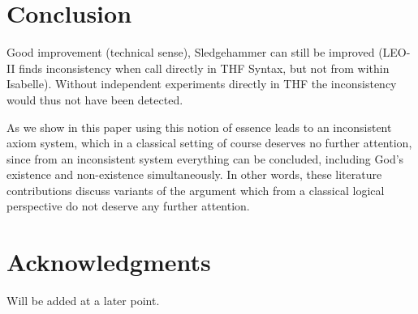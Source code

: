 \documentclass{article}
\begin{document}
\section{Conclusion}


Good improvement (technical sense), Sledgehammer can still be improved
(LEO-II finds inconsistency when call directly in THF Syntax, but not
from within Isabelle). Without independent experiments directly in THF 
the inconsistency would thus not have been detected.


As we show in this paper using this notion of essence
leads to an inconsistent axiom system, which in a classical setting of
course deserves no further attention, since from an inconsistent
system everything can be concluded, including God's existence and
non-existence simultaneously. In other words, these literature
contributions discuss variants of the argument which from a classical
logical perspective do not deserve any further attention.


\section*{Acknowledgments}

Will be added at a later point.


\appendix




\end{document}
